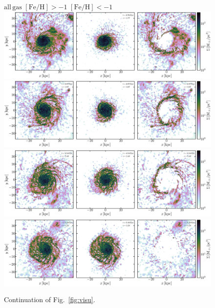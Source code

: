 \documentclass[useAMS,usenatbib]{mnras}
\begin{document}
\begin{figure}
    \begin{centering}
    \hspace*{.5em} $\mathrm{all\, gas}$ \hspace*{12.5em} $\mathrm{[Fe/H]}>-1$ \hspace*{12.em} $\mathrm{[Fe/H]}<-1$ 
     \includegraphics[width=.99\linewidth]{../static/frame0054.pdf}
     \includegraphics[width=.99\linewidth]{../static/frame0058.pdf}
     \includegraphics[width=.99\linewidth]{../static/frame0068.pdf}
     \includegraphics[width=.99\linewidth]{../static/frame0078.pdf}
     \vspace*{-1.em}
     \caption{
     Continuation of Fig.~\ref{fig:visu}.      
     }
     \label{fig:visu2}
    \end{centering}
\end{figure}
\end{document}
